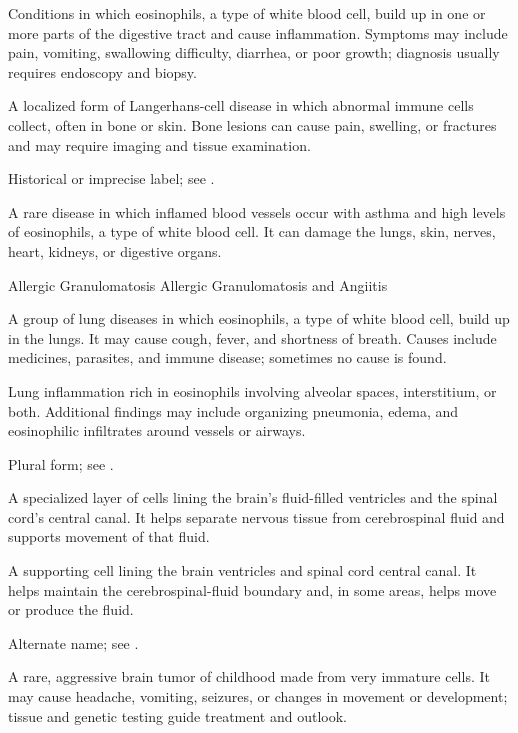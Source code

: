  Conditions in which eosinophils, a type of white blood cell, build up in one or more parts of the digestive tract and cause inflammation. Symptoms may include pain, vomiting, swallowing difficulty, diarrhea, or poor growth; diagnosis usually requires endoscopy and biopsy.

 A localized form of Langerhans-cell disease in which abnormal immune cells collect, often in bone or skin. Bone lesions can cause pain, swelling, or fractures and may require imaging and tissue examination.

 Historical or imprecise label; see .

 A rare disease in which inflamed blood vessels occur with asthma and high levels of eosinophils, a type of white blood cell. It can damage the lungs, skin, nerves, heart, kidneys, or digestive organs.

\synonyms
Allergic Granulomatosis
Allergic Granulomatosis and Angiitis

 A group of lung diseases in which eosinophils, a
type of white blood cell, build up in the lungs. It may cause cough, fever, and
shortness of breath. Causes include medicines, parasites, and immune disease;
sometimes no cause is found.

 Lung inflammation rich in eosinophils involving alveolar spaces, interstitium, or both. Additional findings may include organizing pneumonia, edema, and eosinophilic infiltrates around vessels or airways.

 Plural form; see .

 A specialized layer of cells lining the brain’s fluid-filled ventricles and the spinal cord’s central canal. It helps separate nervous tissue from cerebrospinal fluid and supports movement of that fluid.

 A supporting cell lining the brain ventricles and spinal cord central canal. It helps maintain the cerebrospinal-fluid boundary and, in some areas, helps move or produce the fluid.

 Alternate name; see .

 A rare, aggressive brain tumor of childhood made from very immature cells. It may cause headache, vomiting, seizures, or changes in movement or development; tissue and genetic testing guide treatment and outlook.

